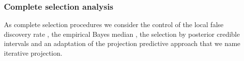\documentclass[american,]{article}
\theoremstyle{definition}
\begin{document}




\hypertarget{complete-selection}{%
\subsubsection{Complete selection analysis}\label{complete-selection}}
As complete selection procedures we consider the control of the local
false discovery rate \citep{paper:efron, efron2012large}, the
empirical Bayes median \citep{johnstone2004needles}, the selection
by posterior credible intervals and an adaptation of the projection 
predictive approach that we name iterative projection.\
\end{document}

